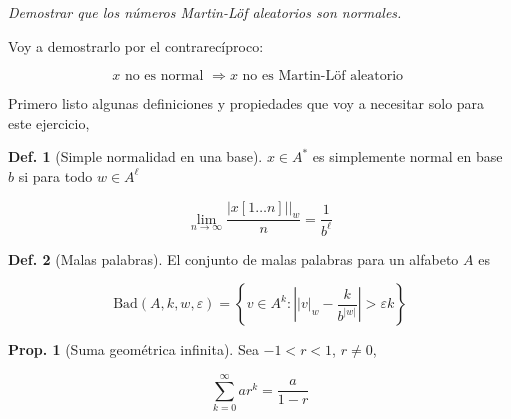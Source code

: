 \documentclass{article}
\theoremstyle{definition} %
\newtheorem{proposition}{Prop.}
\newtheorem{definition}{Def.}
\newcommand{\first}[2]{#2[1 \dots #1]}
\newcommand{\ML}{Martin-Löf }
\newcommand{\occurrencesOf}[2]{|#2|_#1}
\newcommand{\Bad}[4]{\text{Bad}(#1, #2, #3, #4)}
\begin{document}
\textit{Demostrar que los números \ML aleatorios son normales.}

Voy a demostrarlo por el contrarecíproco:

\[
    x \text{ no es normal } \Rightarrow x \text{ no es \ML aleatorio }
\]

Primero listo algunas definiciones y propiedades que voy a necesitar solo para
este ejercicio,

\begin{definition}[Simple normalidad en una base]\label{def:simple-norm}
    $x \in A^*$ es simplemente normal en base $b$ si para todo $w \in A^\ell$

    \[
        \lim_{n\to\infty}
            \frac{\occurrencesOf{w}{\first{n}{x}|}}{n}
            = \frac{1}{b^\ell}
    \]
\end{definition}

\begin{definition}[Malas palabras]\label{def:bad}
    El conjunto de malas palabras para un alfabeto $A$ es

    \[
        \Bad{A}{k}{w}{\varepsilon} = \left\{
            v \in A^k : \left|
                \occurrencesOf{w}{v} - \frac{k}{b^{|w|}}
            \right| > \varepsilon k
        \right\}
    \]
\end{definition}

\begin{proposition}[Suma geométrica infinita]\label{prop:geom-inf-sum}
    Sea $-1 < r < 1$, $r \neq 0$,

    \[
        \sum_{k=0}^{\infty} ar^k
        = \frac{a}{1 - r}
    \]
\end{proposition}
\end{document}
